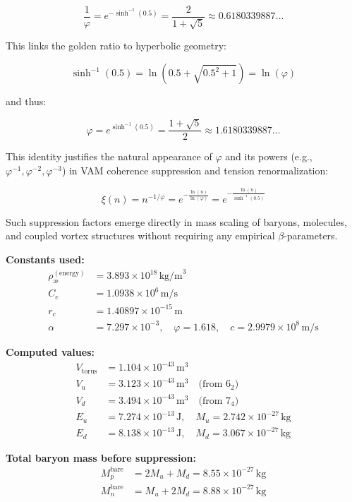 \documentclass[12pt]{article}
\begin{document}
\[
\boxed{
\frac{1}{\varphi} = e^{-\sinh^{-1}(0.5)} = \frac{2}{1 + \sqrt{5}} \approx 0.6180339887\ldots
}
\]

This links the golden ratio to hyperbolic geometry:

\[
\sinh^{-1}(0.5) = \ln\left( 0.5 + \sqrt{0.5^2 + 1} \right) = \ln(\varphi)
\]

and thus:

\[
\boxed{
\varphi = e^{\sinh^{-1}(0.5)} = \frac{1 + \sqrt{5}}{2} \approx 1.6180339887\ldots
}
\]

This identity justifies the natural appearance of \( \varphi \) and its powers (e.g., \( \varphi^{-1}, \varphi^{-2}, \varphi^{-3} \)) in VAM coherence suppression and tension renormalization:

\[
\boxed{
\xi(n) = n^{-1/\varphi} = e^{-\frac{\ln(n)}{\ln(\varphi)}} = e^{-\frac{\ln(n)}{\sinh^{-1}(0.5)}}
}
\]

Such suppression factors emerge directly in mass scaling of baryons, molecules, and coupled vortex structures without requiring any empirical \( \beta \)-parameters.

\textbf{Constants used:}
\begin{align*}
\rho_\text{\ae}^{(\text{energy})} &= 3.893 \times 10^{18} \, \text{kg/m}^3 \\
C_e &= 1.0938 \times 10^6 \, \text{m/s} \\
r_c &= 1.40897 \times 10^{-15} \, \text{m} \\
\alpha &= 7.297 \times 10^{-3}, \quad \varphi = 1.618, \quad c = 2.9979 \times 10^8 \, \text{m/s}
\end{align*}

\textbf{Computed values:}
\begin{align*}
V_{\text{torus}} &= 1.104 \times 10^{-43} \, \text{m}^3 \\
V_u &= 3.123 \times 10^{-43} \, \text{m}^3 \quad \text{(from } 6_2 \text{)} \\
V_d &= 3.494 \times 10^{-43} \, \text{m}^3 \quad \text{(from } 7_4 \text{)} \\
E_u &= 7.274 \times 10^{-13} \, \text{J}, \quad M_u = 2.742 \times 10^{-27} \, \text{kg} \\
E_d &= 8.138 \times 10^{-13} \, \text{J}, \quad M_d = 3.067 \times 10^{-27} \, \text{kg}
\end{align*}

\textbf{Total baryon mass before suppression:}
\begin{align*}
M_p^{\text{bare}} &= 2M_u + M_d = 8.55 \times 10^{-27} \, \text{kg} \\
M_n^{\text{bare}} &= M_u + 2M_d = 8.88 \times 10^{-27} \, \text{kg}
\end{align*}
\end{document}
